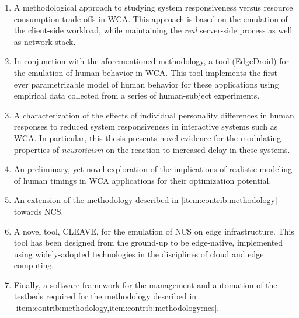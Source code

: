 \begin{enumerate}
    \item\label{item:contrib:methodology} A methodological approach to studying system responsiveness versus resource consumption trade-offs in \ac{WCA}.
    This approach is based on the emulation of the client-side workload, while maintaining the \emph{real} server-side process as well as network stack.
    \item In conjunction with the aforementioned methodology, a tool (EdgeDroid) for the emulation of human behavior in \ac{WCA}.
    This tool implements the first ever parametrizable model of human behavior for these applications using empirical data collected from a series of human-subject experiments.
    \item A characterization of the effects of individual personality differences in human responses to reduced system responsiveness in interactive systems such as \acl{WCA}.
    In particular, this thesis presents novel evidence for the modulating properties of \emph{neuroticism} on the reaction to increased delay in these systems.
    \item An preliminary, yet novel exploration of the implications of realistic modeling of human timings in \ac{WCA} applications for their optimization potential.
    \item\label{item:contrib:methodology:ncs} An extension of the methodology described in \cref{item:contrib:methodology} towards \ac{NCS}.
    \item A novel tool, CLEAVE, for the emulation of \ac{NCS} on edge infrastructure.
    This tool has been designed from the ground-up to be edge-native, implemented using widely-adopted technologies in the disciplines of cloud and edge computing.
    \item Finally, a software framework for the management and automation of the testbeds required for the methodology described in \cref{item:contrib:methodology,item:contrib:methodology:ncs}.
\end{enumerate}


